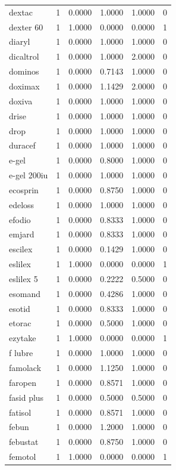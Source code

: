 \begin{longtable}{p{3.0cm}rrrrr}
dextac & 1 & 0.0000 & 1.0000 & 1.0000 & 0 \\
dexter 60 & 1 & 1.0000 & 0.0000 & 0.0000 & 1 \\
diaryl & 1 & 0.0000 & 1.0000 & 1.0000 & 0 \\
dicaltrol & 1 & 0.0000 & 1.0000 & 2.0000 & 0 \\
dominos & 1 & 0.0000 & 0.7143 & 1.0000 & 0 \\
doximax & 1 & 0.0000 & 1.1429 & 2.0000 & 0 \\
doxiva & 1 & 0.0000 & 1.0000 & 1.0000 & 0 \\
drise & 1 & 0.0000 & 1.0000 & 1.0000 & 0 \\
drop & 1 & 0.0000 & 1.0000 & 1.0000 & 0 \\
duracef & 1 & 0.0000 & 1.0000 & 1.0000 & 0 \\
e-gel & 1 & 0.0000 & 0.8000 & 1.0000 & 0 \\
e-gel 200iu & 1 & 0.0000 & 1.0000 & 1.0000 & 0 \\
ecosprin & 1 & 0.0000 & 0.8750 & 1.0000 & 0 \\
edeloss & 1 & 0.0000 & 1.0000 & 1.0000 & 0 \\
efodio & 1 & 0.0000 & 0.8333 & 1.0000 & 0 \\
emjard & 1 & 0.0000 & 0.8333 & 1.0000 & 0 \\
escilex & 1 & 0.0000 & 0.1429 & 1.0000 & 0 \\
eslilex & 1 & 1.0000 & 0.0000 & 0.0000 & 1 \\
eslilex 5 & 1 & 0.0000 & 0.2222 & 0.5000 & 0 \\
esomand & 1 & 0.0000 & 0.4286 & 1.0000 & 0 \\
esotid & 1 & 0.0000 & 0.8333 & 1.0000 & 0 \\
etorac & 1 & 0.0000 & 0.5000 & 1.0000 & 0 \\
ezytake & 1 & 1.0000 & 0.0000 & 0.0000 & 1 \\
f lubre & 1 & 0.0000 & 1.0000 & 1.0000 & 0 \\
famolack & 1 & 0.0000 & 1.1250 & 1.0000 & 0 \\
faropen & 1 & 0.0000 & 0.8571 & 1.0000 & 0 \\
fasid plus & 1 & 0.0000 & 0.5000 & 0.5000 & 0 \\
fatisol & 1 & 0.0000 & 0.8571 & 1.0000 & 0 \\
febun & 1 & 0.0000 & 1.2000 & 1.0000 & 0 \\
febustat & 1 & 0.0000 & 0.8750 & 1.0000 & 0 \\
femotol & 1 & 1.0000 & 0.0000 & 0.0000 & 1 \\

\end{longtable}
